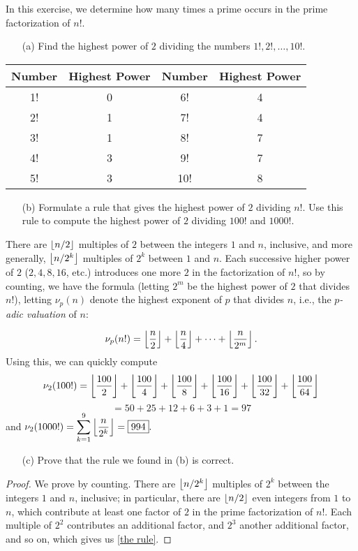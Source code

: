 \documentclass{article}
\begin{document}
\begin{exercise}[Chapter 12, \#5]
In this exercise, we determine how many times a prime occurs in the prime factorization of $n!$.
\begin{itemize}
    \item[(a)] Find the highest power of $2$ dividing the numbers $1!, 2!, \ldots, 10!$.
\end{itemize}
\begin{center}
\begin{tabular}{c|c||c|c}
Number &  Highest Power & Number &  Highest Power \\\hline
1! & 0 & 6! & 4 \\
2! & 1 & 7! & 4 \\
3! & 1 & 8! & 7 \\
4! & 3 & 9! & 7 \\
5! & 3 & 10! & 8 \\
\end{tabular}
\end{center}
\begin{itemize}
    \item[(b)] Formulate a rule that gives the highest power of $2$ dividing $n!$. Use this rule to compute the highest power of $2$ dividing $100!$ and $1000!$.
\end{itemize}
\begin{solution}
There are $\left\lfloor n/2\right\rfloor$ multiples of $2$ between the integers $1$ and $n$, inclusive, and more generally, $\left\lfloor n/2^k\right\rfloor$ multiples of $2^k$ between $1$ and $n$. Each successive higher power of $2$ ($2, 4, 8, 16$, etc.) introduces one more $2$ in the factorization of $n!$, so by counting, we have the formula (letting $2^m$ be the highest power of $2$ that divides $n!$), letting $\nu_p(n)$ denote the highest exponent of $p$ that divides $n$, i.e., the \textit{$p$-adic valuation} of $n$:

\begin{equation}\label{the rule}
\nu_p(n!) = \left\lfloor \frac n2\right\rfloor + \left\lfloor \frac n4\right\rfloor + \cdots + \left\lfloor \frac n{2^m}\right\rfloor.
\end{equation}
Using this, we can quickly compute
$$\nu_2(100!) = \left\lfloor \frac{100}2\right\rfloor + \left\lfloor \frac{100}4\right\rfloor + \left\lfloor \frac{100}8\right\rfloor + \left\lfloor \frac{100}{16}\right\rfloor + \left\lfloor \frac{100}{32}\right\rfloor + \left\lfloor \frac{100}{64}\right\rfloor$$
$$=50 + 25 + 12 + 6 + 3 + 1 = \boxed{97}$$
and $\displaystyle\nu_2(1000!) = \sum_{k=1}^{9} \left\lfloor \frac n{2^k}\right\rfloor = \boxed{994}.$
\end{solution}

\begin{itemize}
    \item[(c)] Prove that the rule we found in (b) is correct.
\end{itemize}
\begin{proof}
We prove by counting. There are $\left\lfloor n/2^k\right\rfloor$ multiples of $2^k$ between the integers $1$ and $n$, inclusive; in particular, there are $\left\lfloor n/2\right\rfloor$ even integers from $1$ to $n$, which contribute at least one factor of $2$ in the prime factorization of $n!$. Each multiple of $2^2$ contributes an additional factor, and $2^3$ another additional factor, and so on, which gives us \eqref{the rule}.
\end{proof}


\end{exercise}
\end{document}
